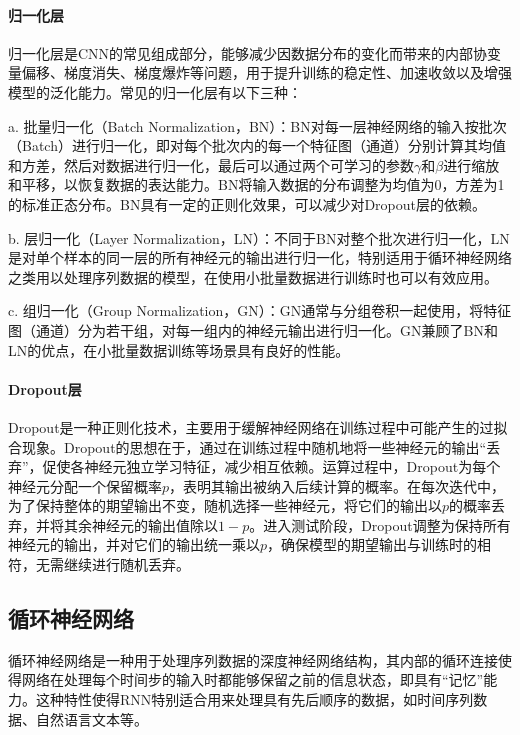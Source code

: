 \paragraph{归一化层}

归一化层是CNN的常见组成部分，能够减少因数据分布的变化而带来的内部协变量偏移、梯度消失、梯度爆炸等问题，用于提升训练的稳定性、加速收敛以及增强模型的泛化能力。常见的归一化层有以下三种：

a. 批量归一化（Batch Normalization，BN）：BN对每一层神经网络的输入按批次（Batch）进行归一化，即对每个批次内的每一个特征图（通道）分别计算其均值和方差，然后对数据进行归一化，最后可以通过两个可学习的参数\(\gamma\)和\(\beta\)进行缩放和平移，以恢复数据的表达能力。BN将输入数据的分布调整为均值为0，方差为1的标准正态分布。BN具有一定的正则化效果，可以减少对Dropout层的依赖。

b. 层归一化（Layer Normalization，LN）：不同于BN对整个批次进行归一化，LN是对单个样本的同一层的所有神经元的输出进行归一化，特别适用于循环神经网络之类用以处理序列数据的模型，在使用小批量数据进行训练时也可以有效应用。

c. 组归一化（Group Normalization，GN）：GN通常与分组卷积\cite{krizhevsky2017imagenet}一起使用，将特征图（通道）分为若干组，对每一组内的神经元输出进行归一化。GN兼顾了BN和LN的优点，在小批量数据训练等场景具有良好的性能。

\paragraph{Dropout层}

Dropout是一种正则化技术，主要用于缓解神经网络在训练过程中可能产生的过拟合现象。Dropout的思想在于，通过在训练过程中随机地将一些神经元的输出“丢弃”，促使各神经元独立学习特征，减少相互依赖。运算过程中，Dropout为每个神经元分配一个保留概率\(p\)，表明其输出被纳入后续计算的概率。在每次迭代中，为了保持整体的期望输出不变，随机选择一些神经元，将它们的输出以\(p\)的概率丢弃，并将其余神经元的输出值除以\(1-p\)。进入测试阶段，Dropout调整为保持所有神经元的输出，并对它们的输出统一乘以\(p\)，确保模型的期望输出与训练时的相符，无需继续进行随机丢弃。

\subsection{循环神经网络}

循环神经网络是一种用于处理序列数据的深度神经网络结构，其内部的循环连接使得网络在处理每个时间步的输入时都能够保留之前的信息状态，即具有“记忆”能力。这种特性使得RNN特别适合用来处理具有先后顺序的数据，如时间序列数据、自然语言文本等。

